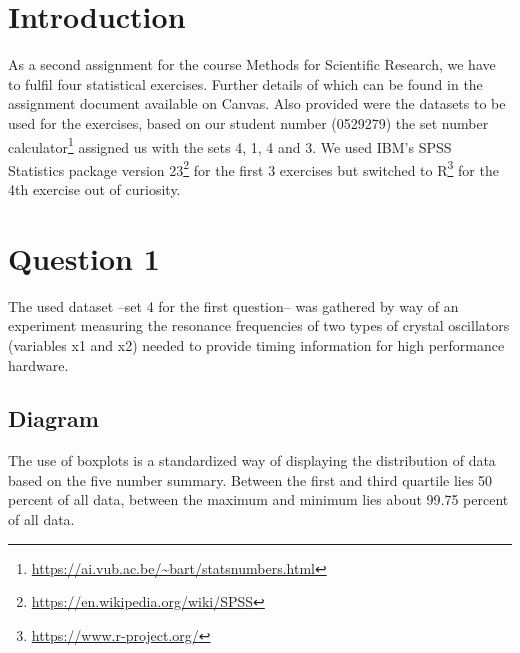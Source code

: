 \documentclass[14]{article}
\begin{document}
\author{\textbf{Faculty of Sciences and Bio-Engineering Sciences}\\[2\baselineskip]\newline\textbf{Arthur Chomé - 0529279}}

\date{ \LARGE Assignment 2: Statistics}
\title{\vspace{-8cm}}%

\maketitle

\section{Introduction}
As a second assignment for the course Methods for Scientific Research, we have to fulfil four statistical exercises. Further details of which can be found in the assignment document available on Canvas. Also provided were the datasets to be used for the exercises, based on our student number (0529279) the set number calculator\footnote{\protect\url{https://ai.vub.ac.be/~bart/statsnumbers.html}} assigned us with the sets 4, 1, 4 and 3. We used IBM's SPSS Statistics package version 23\footnote{\protect\url{https://en.wikipedia.org/wiki/SPSS}} for the first 3 exercises but switched to R\footnote{\protect\url{https://www.r-project.org/}} for the 4th exercise out of curiosity. 

\section{Question 1}
The used dataset --set 4 for the first question-- was gathered by way of an experiment measuring the resonance frequencies of two types of crystal oscillators (variables x1 and x2) needed to provide timing information for high performance hardware. 

\subsection{Diagram}
The use of boxplots is a standardized way of displaying the distribution of data based on the five number summary. Between the first and third quartile lies 50 percent of all data, between the maximum and minimum lies about 99.75 percent of all data.
\end{document}
